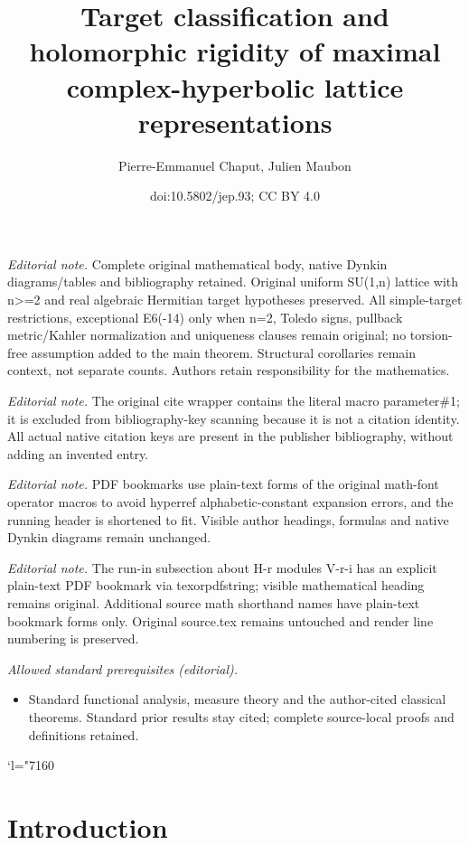 \documentclass[10pt]{amsart}
\title{Target classification and holomorphic rigidity of maximal complex-hyperbolic lattice representations}
\author{Pierre-Emmanuel Chaput, Julien Maubon}
\date{doi:10.5802/jep.93; CC BY 4.0}
\newcommand{\Changel}{\mathcode`l="7160}
\theoremstyle{plain}
\theoremstyle{definition}
\providecommand{\mainmatter}{}\providecommand{\backmatter}{}
\begin{document}
\maketitle
\noindent\textit{Editorial note.} Complete original mathematical body, native Dynkin diagrams/tables and bibliography retained. Original uniform SU(1,n) lattice with n>=2 and real algebraic Hermitian target hypotheses preserved. All simple-target restrictions, exceptional E6(-14) only when n=2, Toledo signs, pullback metric/Kahler normalization and uniqueness clauses remain original; no torsion-free assumption added to the main theorem. Structural corollaries remain context, not separate counts. Authors retain responsibility for the mathematics.\par\medskip
\noindent\textit{Editorial note.} The original cite wrapper contains the literal macro parameter\#1; it is excluded from bibliography-key scanning because it is not a citation identity. All actual native citation keys are present in the publisher bibliography, without adding an invented entry.\par\medskip
\noindent\textit{Editorial note.} PDF bookmarks use plain-text forms of the original math-font operator macros to avoid hyperref alphabetic-constant expansion errors, and the running header is shortened to fit. Visible author headings, formulas and native Dynkin diagrams remain unchanged.\par\medskip
\noindent\textit{Editorial note.} The run-in subsection about H-r modules V-r-i has an explicit plain-text PDF bookmark via texorpdfstring; visible mathematical heading remains original. Additional source math shorthand names have plain-text bookmark forms only. Original source.tex remains untouched and render line numbering is preserved.\par\medskip
\noindent\textit{Allowed standard prerequisites (editorial).}\begin{itemize}
\item Standard functional analysis, measure theory and the author-cited classical theorems. Standard prior results stay cited; complete source-local proofs and definitions retained.
\end{itemize}\medskip

\newpage
\tableofcontents
\mainmatter

\bgroup
\Changel

\section{Introduction}
\end{document}
